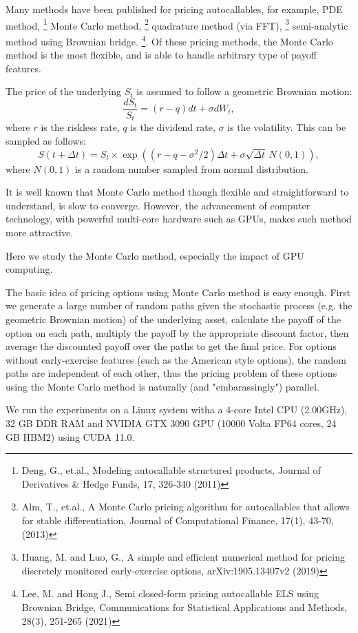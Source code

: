 Many methods have been published for pricing autocallables, for example, 
PDE method,
\footnote{Deng, G., et.al., Modeling autocallable structured products,
          Journal of Derivatives \& Hedge Funds, 17, 326-340 (2011)}
Monte Carlo method,
\footnote{Alm, T., et.al., A Monte Carlo pricing algorithm for autocallables
          that allows for stable differentiation, Journal of Computational
          Finance, 17(1), 43-70, (2013)}
quadrature method (via FFT),
\footnote{Huang, M. and Luo, G., A simple and efficient numerical method for
          pricing discretely monitored early-exercise options,
          arXiv:1905.13407v2 (2019)}
semi-analytic method using Brownian bridge.
\footnote{Lee, M. and Hong J., Semi closed-form pricing autocallable ELS using
          Brownian Bridge, Communications for Statistical Applications and
          Methods, 28(3), 251-265 (2021)}.
Of these pricing methods, the Monte Carlo method is the most flexible, and is
able to handle arbitrary type of payoff features.

The price of the underlying $S_t$ is assumed to follow a geometric Brownian 
motion:
\begin{equation}
  \frac{dS_t}{S_t} = (r-q)dt + \sigma dW_t,
\end{equation}
where $r$ is the riskless rate, $q$ is the dividend rate, $\sigma$ is the
volatility.
This can be sampled as follows:
\begin{equation}
  S(t+\Delta t) = S_t \times 
      \exp\left( 
        (r-q-\sigma^2/2)\Delta t + \sigma\sqrt{\Delta t}\, N(0,1)
          \right),
\end{equation}
where $N(0,1)$ is a random number sampled from normal distribution.


It is well known that Monte Carlo method though flexible and straightforward to
understand, is slow to converge. However, the advancement of computer
technology, with powerful multi-core hardware such as GPUs, makes such method
more attractive.

Here we study the Monte Carlo method, especially the impact of GPU computing.

The basic idea of pricing options using Monte Carlo method is easy enough.
First we generate a large number of random paths given the stochastic
process (e.g. the geometric Brownian motion) of the underlying asset, calculate
the payoff of the option on each path, multiply the payoff by the appropriate
discount factor, then average the discounted payoff over the paths to
get the final price. For options without early-exercise features (such as the
American style options), the random paths are independent of each other, thus
the pricing problem of these options using the Monte Carlo method is naturally
(and "embarassingly") parallel.

We run the experiments on a Linux system witha a 4-core Intel CPU (2.00GHz),
32 GB DDR RAM and NVIDIA GTX 3090 GPU (10000 Volta FP64 cores, 24 GB HBM2) using
CUDA 11.0.




